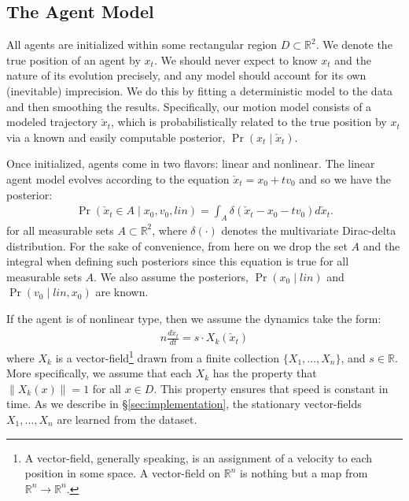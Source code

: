 \documentclass[letterpaper,10pt,conference]{ieeeconf}
\begin{document}
\subsection{The Agent Model}
All agents are initialized within some rectangular region $D \subset \mathbb{R}^2$.
We denote the true position of an agent by $x_t$.
We should never expect to know $x_t$ and the nature of its evolution precisely, and any model should account for its own (inevitable) imprecision.
We do this by fitting a deterministic model to the data and then smoothing the results.
Specifically, our motion model consists of a modeled trajectory $\check{x}_t$, which is probabilistically related to the true position by $x_t$ via a known and easily computable posterior, $\Pr(x_t \mid \check{x}_t)$.

Once initialized, agents come in two flavors: linear and nonlinear.
The linear agent model evolves according to the equation $\check{x}_t = x_0 + t v_0$ and so we have the posterior:
\begin{align}
	\Pr( \check{x}_t  \in A \mid x_0, v_0, lin) = \int_A \delta( \check{x}_t - x_0 - t v_0 ) d\check{x}_t.
\end{align}
for all measurable sets $A \subset \mathbb{R}^2$, where $\delta( \cdot )$ denotes the multivariate Dirac-delta distribution.
For the sake of convenience, from here on we drop the set $A$ and the integral when defining such posteriors since this equation is true for all measurable sets $A$.
We also assume the posteriors, $\Pr(x_0 \mid lin)$ and $\Pr( v_0 \mid lin, x_0)$ are known.

If the agent is of nonlinear type, then we assume the dynamics take the form:
\begin{align}n
	\frac{d \check{x}_t}{dt} = s \cdot X_k(\check{x}_t) \label{eq:ode}
\end{align}
where $X_k$ is a vector-field\footnote{A vector-field, generally speaking, is an assignment of a velocity to each position in some space.  A vector-field on $\mathbb{R}^n$ is nothing but a map from $\mathbb{R}^n \to \mathbb{R}^n$.} drawn from a finite collection $\{X_1, \dots, X_n\}$, and $s \in \mathbb{R}$.
More specifically, we assume that each $X_k$ has the property that $\| X_k(x) \| = 1$ for all $x \in D$.
This property ensures that speed is constant in time.
As we describe in \S \ref{sec:implementation}, the stationary vector-fields $X_1,\dots,X_n$ are learned from the dataset.
\end{document}
